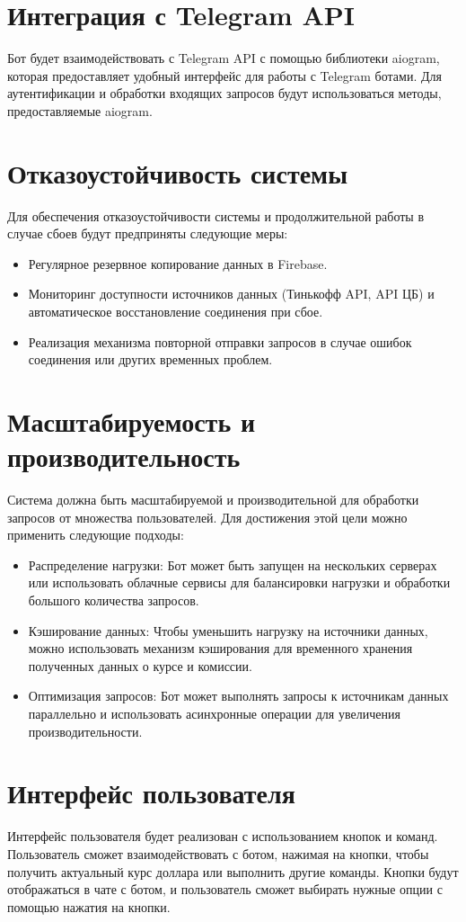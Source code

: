 \documentclass{article}
\begin{document}
\section{Интеграция с Telegram API}
Бот будет взаимодействовать с Telegram API с помощью библиотеки aiogram, которая предоставляет удобный интерфейс для работы с Telegram ботами. Для аутентификации и обработки входящих запросов будут использоваться методы, предоставляемые aiogram.

\section{Отказоустойчивость системы}
Для обеспечения отказоустойчивости системы и продолжительной работы в случае сбоев будут предприняты следующие меры:
\begin{itemize}
  \item Регулярное резервное копирование данных в Firebase.
  \item Мониторинг доступности источников данных (Тинькофф API, API ЦБ) и автоматическое восстановление соединения при сбое.
  \item Реализация механизма повторной отправки запросов в случае ошибок соединения или других временных проблем.
\end{itemize}

\section{Масштабируемость и производительность}
Система должна быть масштабируемой и производительной для обработки запросов от множества пользователей. Для достижения этой цели можно применить следующие подходы:
\begin{itemize}
  \item Распределение нагрузки: Бот может быть запущен на нескольких серверах или использовать облачные сервисы для балансировки нагрузки и обработки большого количества запросов.
  \item Кэширование данных: Чтобы уменьшить нагрузку на источники данных, можно использовать механизм кэширования для временного хранения полученных данных о курсе и комиссии.
  \item Оптимизация запросов: Бот может выполнять запросы к источникам данных параллельно и использовать асинхронные операции для увеличения производительности.
\end{itemize}

\section{Интерфейс пользователя}
Интерфейс пользователя будет реализован с использованием кнопок и команд. Пользователь сможет взаимодействовать с ботом, нажимая на кнопки, чтобы получить актуальный курс доллара или выполнить другие команды. Кнопки будут отображаться в чате с ботом, и пользователь сможет выбирать нужные опции с помощью нажатия на кнопки.
\end{document}

